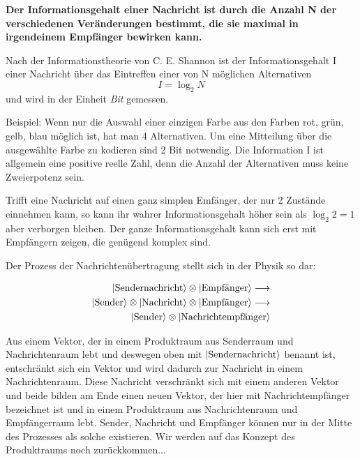 \documentclass[12pt]{book}
\begin{document}
\textbf{Der Informationsgehalt einer Nachricht ist durch die Anzahl N der verschiedenen Veränderungen bestimmt, die sie maximal in irgendeinem Empfänger bewirken kann.} 

Nach der Informationstheorie von C. E. Shannon ist der Informationsgehalt I einer Nachricht über das Eintreffen einer von N möglichen Alternativen
\begin{equation} 
I = \log_2 N 
\end{equation}
und wird in der Einheit \emph{Bit} gemessen.

Beispiel: Wenn nur die Auswahl einer einzigen Farbe aus den Farben {rot, grün, gelb, blau} möglich ist, hat man 4 Alternativen. Um eine Mitteilung über die ausgewählte Farbe zu kodieren sind 2 Bit notwendig. Die Information I ist allgemein eine positive reelle Zahl, denn die Anzahl der Alternativen muss keine Zweierpotenz sein.

Trifft eine Nachricht auf einen ganz simplen Emfänger, der nur 2 Zustände einnehmen kann, so kann ihr wahrer Informationsgehalt höher sein als $\log_2 2 = 1$ aber verborgen bleiben. Der ganze Informationsgehalt kann sich erst mit Empfängern zeigen, die genügend komplex sind.

Der Prozess der Nachrichtenübertragung stellt sich in der Physik so dar:

\begin{equation} 
\begin{split}
\ket{\text{Sendernachricht}} \otimes \ket{\text{Empfänger}} \longrightarrow \\
\ket{\text{Sender}} \otimes \ket{\text{Nachricht}} \otimes \ket{\text{Empfänger}} \longrightarrow \\
\ket{\text{Sender}} \otimes \ket{\text{Nachrichtempfänger}} 
\label{eq:messaging_qm}
\end{split}
\end{equation}

Aus einem Vektor, der in einem Produktraum aus Senderraum und Nachrichtenraum lebt und deswegen oben mit $\ket{\text{Sendernachricht}}$ benannt ist, entschränkt sich ein Vektor und wird dadurch zur Nachricht
in einem Nachrichtenraum. Diese Nachricht verschränkt sich mit einem anderen Vektor und beide bilden am Ende einen neuen Vektor, der hier mit Nachrichtempfänger bezeichnet ist und in einem Produktraum aus 
Nachrichtenraum und Empfängerraum lebt. Sender, Nachricht und Empfänger können nur in der Mitte des Prozesses als solche existieren. Wir werden auf das Konzept des Produktraums noch zurückkommen...
\end{document}
